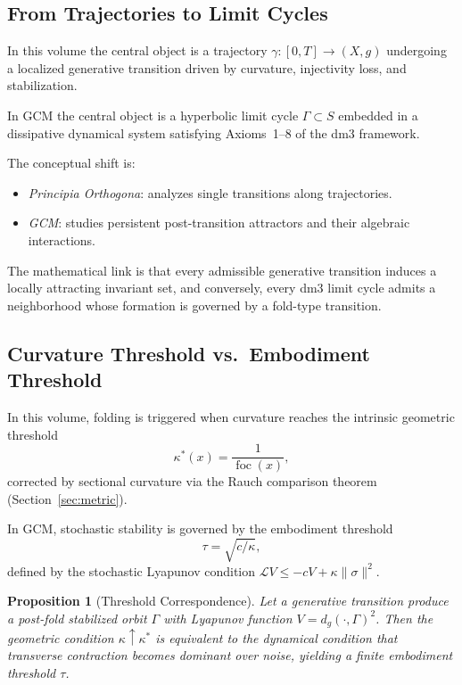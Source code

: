 \documentclass[12pt, oneside]{book}
\theoremstyle{plain}
\newtheorem{proposition}[theorem]{Proposition}
\theoremstyle{definition}
\theoremstyle{remark}
\begin{document}
\subsection{From Trajectories to Limit Cycles}

In this volume the central object is a trajectory
$\gamma : [0,T] \to (X,g)$ undergoing a localized generative
transition driven by curvature, injectivity loss, and stabilization.

In GCM the central object is a hyperbolic limit cycle
$\Gamma \subset S$ embedded in a dissipative dynamical system
satisfying Axioms~1--8 of the dm3 framework.

The conceptual shift is:
\begin{itemize}[leftmargin=*]
  \item \emph{Principia Orthogona}: analyzes single transitions
        along trajectories.
  \item \emph{GCM}: studies persistent post-transition attractors
        and their algebraic interactions.
\end{itemize}

The mathematical link is that every admissible generative transition
induces a locally attracting invariant set, and conversely, every
dm3 limit cycle admits a neighborhood whose formation is governed by
a fold-type transition.

\subsection{Curvature Threshold vs.\ Embodiment Threshold}

In this volume, folding is triggered when curvature reaches the
intrinsic geometric threshold
\[
  \kappa^*(x) = \frac{1}{\operatorname{foc}(x)},
\]
corrected by sectional curvature via the Rauch comparison theorem
(Section~\ref{sec:metric}).

In GCM, stochastic stability is governed by the embodiment threshold
\[
  \tau = \sqrt{c/\kappa},
\]
defined by the stochastic Lyapunov condition
$\mathcal{L}V \le -cV + \kappa\|\sigma\|^2$.

\begin{proposition}[Threshold Correspondence]\label{prop:threshold}
Let a generative transition produce a post-fold stabilized orbit
$\Gamma$ with Lyapunov function $V = d_g(\cdot,\Gamma)^2$. Then
the geometric condition $\kappa \uparrow \kappa^*$ is equivalent to
the dynamical condition that transverse contraction becomes dominant
over noise, yielding a finite embodiment threshold $\tau$.
\end{proposition}
\end{document}
